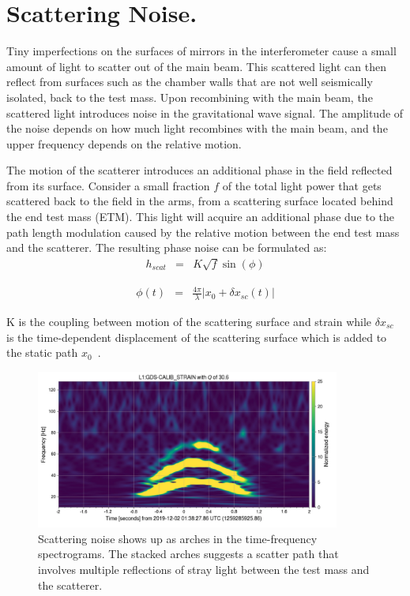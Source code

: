 \documentclass[12pt]{iopart}
\begin{document}
 
\section{Scattering Noise.}\label{scatteringnoise}
Tiny imperfections on the surfaces of mirrors in the interferometer cause a small amount of light to scatter out of the main beam. This scattered light can then reflect from surfaces such as the chamber walls that are not well seismically isolated, back to the test mass. Upon recombining with the main beam, the scattered light introduces noise in the gravitational wave signal. The amplitude of the noise depends on how much light recombines with the main beam, and the upper frequency depends on the relative motion.

The motion of the scatterer introduces an additional phase in the field reflected from its surface. Consider a small fraction $f$ of the total light power that gets scattered back to the field in the arms, from a scattering surface located behind the end test mass (ETM). This light will acquire an additional phase due to the path length modulation caused by the relative motion between the end test mass and the scatterer. The resulting phase noise can be formulated as:
\begin{eqnarray}
      h_{scat} & = & K\sqrt{f}\sin({\phi}) \label{eq:1}
\end{eqnarray}

\begin{eqnarray}
    {\phi}(t) & = & \frac{4{\pi}}{{\lambda}}\left|{ x_{0} + {\delta} x_{sc}(t)}\right| \label{eq:2}
\end{eqnarray}
    
K is the coupling between motion of the scattering surface and strain while $\delta x_{sc}$ is the time-dependent displacement of the scattering surface which is added to the static path $x_{0}$~\cite{scatvirgo}. 
\par

\begin{figure}[h]
    \centering
    \includegraphics[width=10cm]{scatindarmlrs.eps}
    \caption{Scattering noise shows up as arches in the time-frequency spectrograms. The stacked arches suggests a scatter path that involves multiple reflections of stray light between the test mass and the scatterer.}
    \label{fig:scat}
\end{figure}
\end{document}
